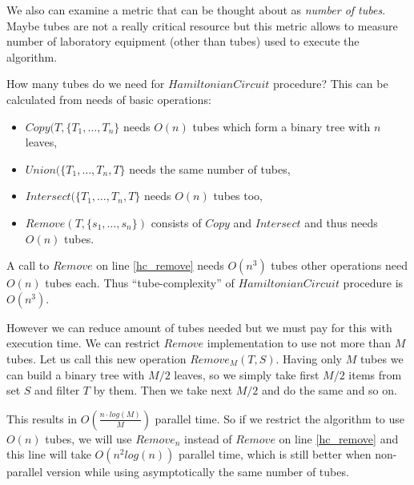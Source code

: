We also can examine a metric that can be thought about as \emph{number of tubes}. Maybe tubes are not a really critical resource but this metric allows to measure number of laboratory equipment (other than tubes) used to execute the algorithm. 

How many tubes do we need for $HamiltonianCircuit$ procedure? This can be calculated from needs of basic operations:
\begin{itemize}
	\item $Copy(T, \{T_1, \dots, T_n\}$ needs $O(n)$ tubes which form a binary tree with $n$ leaves,
	\item $Union(\{T_1, \dots, T_n, T\}$ needs the same number of tubes,
	\item $Intersect(\{T_1, \dots, T_n, T\}$ needs $O(n)$ tubes too,
	\item $Remove(T, \{s_1, \dots, s_n\})$ consists of $Copy$ and $Intersect$ and thus needs $O(n)$ tubes.
\end{itemize}

A call to $Remove$ on line \ref{hc_remove} needs $O(n^3)$ tubes other operations need $O(n)$ tubes each. Thus ``tube-complexity'' of $HamiltonianCircuit$ procedure is $O(n^3)$. 

However we can reduce amount of tubes needed but we must pay for this with execution time. We can restrict $Remove$ implementation to use not more than $M$ tubes. Let us call this new operation $Remove_M(T, S)$. Having only $M$ tubes we can build a binary tree with $M/2$ leaves, so we simply take first $M/2$ items from set $S$ and filter $T$ by them. Then we take next $M/2$ and do the same and so on.


This results in $O\left(\frac{n \cdot log(M)}{M}\right)$ parallel time. So if we restrict the algorithm to use $O(n)$ tubes, we will use $Remove_n$ instead of $Remove$ on line \ref{hc_remove} and this line will take $O( n^2 log(n))$ parallel time, which is still better when non-parallel version while using asymptotically the same number of tubes.